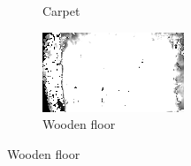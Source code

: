 \begin{figure}[h!t]
\begin{subfigure}[b]{0.25\textwidth}
        \caption{Carpet}
        \label{fig:material-carpet}
    \end{subfigure}%
    \begin{subfigure}[b]{0.25\textwidth}
        \centering
        \includegraphics[width=0.9\linewidth]{images/materials/wood-conf}
        \caption{Wooden floor}
        \label{fig:material-wood}
    \end{subfigure}%

    \vspace{0.5em}


\end{figure}
